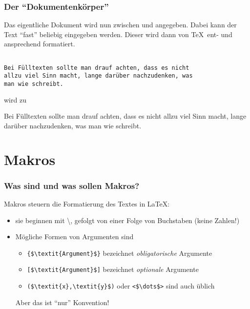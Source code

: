 \begin{frame}[fragile]
  \frametitle{Der \enquote{Dokumentenkörper}}

  Das eigentliche Dokument wird nun zwischen \lstinline!! und
    \lstinline!! angegeben.  Dabei kann der Text \enquote{fast} beliebig
  eingegeben werden.  Dieser wird dann von \TeX\ ent- und ansprechend formatiert.

\begin{lstlisting}

Bei Fülltexten sollte man drauf achten, dass es nicht
allzu viel Sinn macht, lange darüber nachzudenken, was
man wie schreibt.

\end{lstlisting}

  wird zu

  \begin{center}
    \parbox{0.8\linewidth}{\rm Bei Fülltexten sollte man drauf achten, dass es
      nicht allzu viel Sinn macht, lange darüber nachzudenken, was man wie schreibt.}
  \end{center}
\end{frame}

\section{Makros}

\begin{frame}[fragile]
  \frametitle{Was sind und was sollen Makros?}

  \onslide<+->

  Makros steuern die Formatierung des Textes in \LaTeX:

  \begin{itemize}
  \item<+-> sie beginnen mit \textbackslash, gefolgt von einer Folge von Buchstaben (keine
    Zahlen!)
  \item<+-> Mögliche Formen von Argumenten sind
    \begin{itemize}
    \item \lstinline!{$\textit{Argument}$}! bezeichnet \emph{obligatorische} Argumente
    \item \lstinline![$\textit{Argument}$]! bezeichnet \emph{optionale} Argumente
    \item \lstinline!($\textit{x},\textit{y}$)! oder \lstinline!<$\dots$>! sind auch
      üblich
    \end{itemize}

    Aber das ist \enquote{nur} Konvention!
  \end{itemize}
\end{frame}


